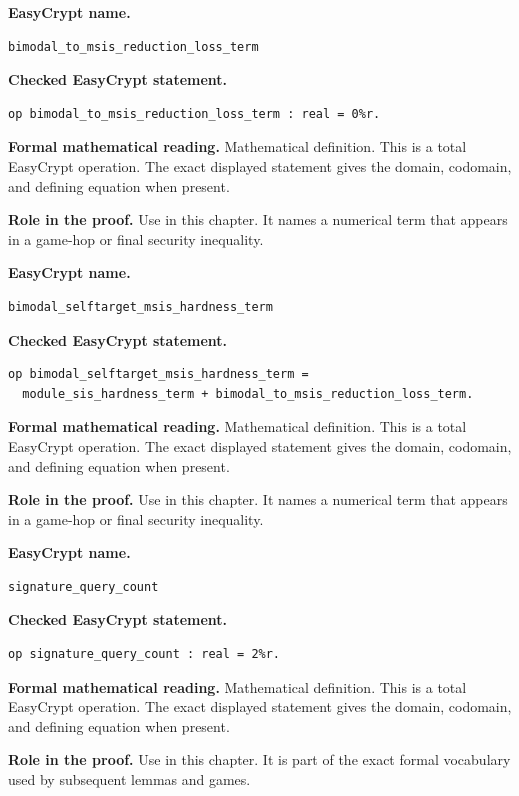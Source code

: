\begin{formaldefinition}
\noindent\textbf{EasyCrypt name.}
\begin{lstlisting}[language=EasyCrypt,basicstyle=\ttfamily\scriptsize]
bimodal_to_msis_reduction_loss_term
\end{lstlisting}
\noindent\textbf{Checked EasyCrypt statement.}
\begin{lstlisting}[language=EasyCrypt,basicstyle=\ttfamily\scriptsize]
op bimodal_to_msis_reduction_loss_term : real = 0%r.
\end{lstlisting}
\noindent\textbf{Formal mathematical reading.}
Mathematical definition. This is a total EasyCrypt operation.  The exact displayed statement gives the domain, codomain, and defining equation when present.

\noindent\textbf{Role in the proof.}
Use in this chapter. It names a numerical term that appears in a game-hop or final security inequality.

\end{formaldefinition}

\begin{formaldefinition}
\noindent\textbf{EasyCrypt name.}
\begin{lstlisting}[language=EasyCrypt,basicstyle=\ttfamily\scriptsize]
bimodal_selftarget_msis_hardness_term
\end{lstlisting}
\noindent\textbf{Checked EasyCrypt statement.}
\begin{lstlisting}[language=EasyCrypt,basicstyle=\ttfamily\scriptsize]
op bimodal_selftarget_msis_hardness_term =
  module_sis_hardness_term + bimodal_to_msis_reduction_loss_term.
\end{lstlisting}
\noindent\textbf{Formal mathematical reading.}
Mathematical definition. This is a total EasyCrypt operation.  The exact displayed statement gives the domain, codomain, and defining equation when present.

\noindent\textbf{Role in the proof.}
Use in this chapter. It names a numerical term that appears in a game-hop or final security inequality.

\end{formaldefinition}

\begin{formaldefinition}
\noindent\textbf{EasyCrypt name.}
\begin{lstlisting}[language=EasyCrypt,basicstyle=\ttfamily\scriptsize]
signature_query_count
\end{lstlisting}
\noindent\textbf{Checked EasyCrypt statement.}
\begin{lstlisting}[language=EasyCrypt,basicstyle=\ttfamily\scriptsize]
op signature_query_count : real = 2%r.
\end{lstlisting}
\noindent\textbf{Formal mathematical reading.}
Mathematical definition. This is a total EasyCrypt operation.  The exact displayed statement gives the domain, codomain, and defining equation when present.

\noindent\textbf{Role in the proof.}
Use in this chapter. It is part of the exact formal vocabulary used by subsequent lemmas and games.

\end{formaldefinition}

